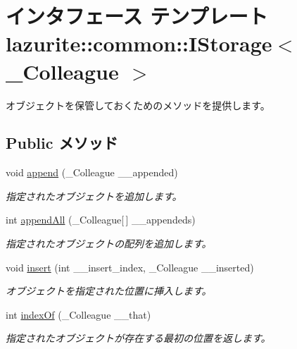 \hypertarget{interfacelazurite_1_1common_1_1_i_storage_3_01___colleague_01_4}{
\section{インタフェース テンプレート lazurite::common::IStorage$<$ \_\-Colleague $>$}
\label{interfacelazurite_1_1common_1_1_i_storage_3_01___colleague_01_4}
}


オブジェクトを保管しておくためのメソッドを提供します。  
\subsection*{Public メソッド}
\begin{DoxyCompactItemize}
\item 
void \hyperlink{interfacelazurite_1_1common_1_1_i_storage_3_01___colleague_01_4_ad53194b6ac42c987b9c8381bd3fd10a6}{append} (\_\-Colleague \_\-\_\-appended)
\begin{DoxyCompactList}\small\item\em 指定されたオブジェクトを追加します。 \item\end{DoxyCompactList}\item 
int \hyperlink{interfacelazurite_1_1common_1_1_i_storage_3_01___colleague_01_4_a989b710a15932535d979a8843c83f762}{appendAll} (\_\-Colleague\mbox{[}$\,$\mbox{]} \_\-\_\-appendeds)
\begin{DoxyCompactList}\small\item\em 指定されたオブジェクトの配列を追加します。 \item\end{DoxyCompactList}\item 
void \hyperlink{interfacelazurite_1_1common_1_1_i_storage_3_01___colleague_01_4_aa25ddcc85fa8621f2f5d9c9696d80c0f}{insert} (int \_\-\_\-insert\_\-index, \_\-Colleague \_\-\_\-inserted)
\begin{DoxyCompactList}\small\item\em オブジェクトを指定された位置に挿入します。 \item\end{DoxyCompactList}\item 
int \hyperlink{interfacelazurite_1_1common_1_1_i_storage_3_01___colleague_01_4_abff9ec059a0222534ab4f925b25a6bec}{indexOf} (\_\-Colleague \_\-\_\-that)
\begin{DoxyCompactList}\small\item\em 指定されたオブジェクトが存在する最初の位置を返します。 \item\end{DoxyCompactList}\item 

\end{DoxyCompactItemize}
